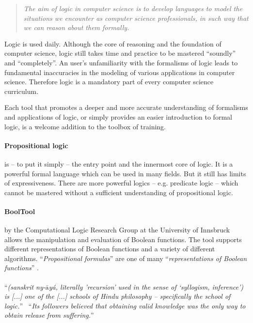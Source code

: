 
\begin{quote}
\em The aim of logic in computer science is to develop languages 
to model the situations we encounter as computer science professionals, 
in such way that we can reason about them formally. \cite[p.1]{Huth:2004:LCS:975331}
\end{quote}

Logic is used daily. Although the core of reasoning and the foundation of computer science, 
logic still takes time and practice to be mastered “soundly” and “completely”. 
An user’s unfamiliarity with the formalisms of logic leads to fundamental inaccuracies 
in the modeling of various applications in computer science. 
Therefore logic is a mandatory part of every computer science curriculum. 

Each tool that promotes a deeper and more accurate understanding of formalisms and applications of logic,
or simply provides an easier introduction to formal logic, 
is a welcome addition to the toolbox of training.


\paragraph{Propositional logic}is – to put it simply – the entry point and the innermost core of logic. 
It is a powerful formal language which can be used in many fields. 
But it still has limits of expressiveness.
There are more powerful logics – e.g. predicate logic –
which cannot be mastered without a sufficient understanding of propositional logic.

\paragraph{BoolTool}by the Computational Logic Research Group at the University of Innsbruck allows the manipulation and evaluation of Boolean functions. The tool supports different representations of Boolean functions and a variety of different algorithms.
“{\em Propositional formulas}” are one of many “{\em representations of Boolean functions}” \cite[p.159]{Huth:2004:LCS:975331}.

\paragraph{\Nyaya}“{\em (sanskrit ny-$\bar{\mbox{a}}$yá, literally 'recursion’  used in the sense of  ‘syllogism, inference’) is [...] one of the [...] schools of Hindu philosophy – specifically the school of logic.}”\ \cite{WIKIPEDIA:NYAYA}
“{\em{}Its followers believed that obtaining valid knowledge was the only way  to obtain release from suffering.}”\ \cite{IEP:NYAYA} 

